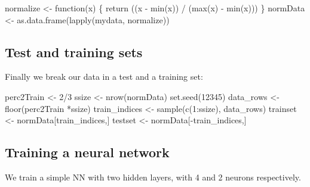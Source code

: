 \documentclass[
  letterpaper,
  DIV=11,
  numbers=noendperiod]{scrartcl}
\newenvironment{Shaded}{\begin{snugshade}}{\end{snugshade}}
\newcommand{\ControlFlowTok}[1]{\textcolor[rgb]{0.00,0.23,0.31}{#1}}
\newcommand{\DecValTok}[1]{\textcolor[rgb]{0.68,0.00,0.00}{#1}}
\newcommand{\FunctionTok}[1]{\textcolor[rgb]{0.28,0.35,0.67}{#1}}
\newcommand{\NormalTok}[1]{\textcolor[rgb]{0.00,0.23,0.31}{#1}}
\newcommand{\OtherTok}[1]{\textcolor[rgb]{0.00,0.23,0.31}{#1}}
\newcommand{\SpecialCharTok}[1]{\textcolor[rgb]{0.37,0.37,0.37}{#1}}
\begin{document}
\begin{Shaded}
\begin{Highlighting}[]
\NormalTok{normalize }\OtherTok{\textless{}{-}} \ControlFlowTok{function}\NormalTok{(x) \{}
  \FunctionTok{return}\NormalTok{ ((x }\SpecialCharTok{{-}} \FunctionTok{min}\NormalTok{(x)) }\SpecialCharTok{/}\NormalTok{ (}\FunctionTok{max}\NormalTok{(x) }\SpecialCharTok{{-}} \FunctionTok{min}\NormalTok{(x)))}
\NormalTok{\}}
\NormalTok{normData }\OtherTok{\textless{}{-}} \FunctionTok{as.data.frame}\NormalTok{(}\FunctionTok{lapply}\NormalTok{(mydata, normalize))}
\end{Highlighting}
\end{Shaded}

\hypertarget{test-and-training-sets}{%
\subsection{Test and training sets}\label{test-and-training-sets}}

Finally we break our data in a test and a training set:

\begin{Shaded}
\begin{Highlighting}[]
\NormalTok{perc2Train }\OtherTok{\textless{}{-}} \DecValTok{2}\SpecialCharTok{/}\DecValTok{3}
\NormalTok{ssize }\OtherTok{\textless{}{-}} \FunctionTok{nrow}\NormalTok{(normData)}
\FunctionTok{set.seed}\NormalTok{(}\DecValTok{12345}\NormalTok{)}
\NormalTok{data\_rows }\OtherTok{\textless{}{-}} \FunctionTok{floor}\NormalTok{(perc2Train }\SpecialCharTok{*}\NormalTok{ssize)}
\NormalTok{train\_indices }\OtherTok{\textless{}{-}} \FunctionTok{sample}\NormalTok{(}\FunctionTok{c}\NormalTok{(}\DecValTok{1}\SpecialCharTok{:}\NormalTok{ssize), data\_rows)}
\NormalTok{trainset }\OtherTok{\textless{}{-}}\NormalTok{ normData[train\_indices,]}
\NormalTok{testset }\OtherTok{\textless{}{-}}\NormalTok{ normData[}\SpecialCharTok{{-}}\NormalTok{train\_indices,]}
\end{Highlighting}
\end{Shaded}

\hypertarget{training-a-neural-network}{%
\subsection{Training a neural network}\label{training-a-neural-network}}

We train a simple NN with two hidden layers, with 4 and 2 neurons
respectively.
\end{document}
